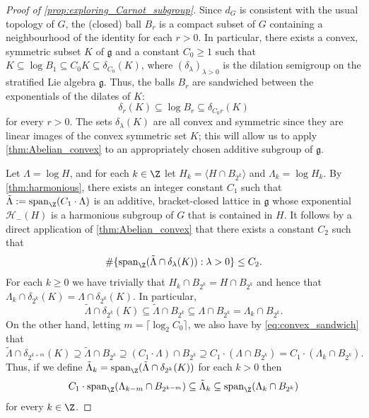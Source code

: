\begin{proof}[Proof of \cref{prop:exploring_Carnot_subgroup}]
Since $d_G$ is consistent with the usual topology of $G$, the (closed) ball $B_r$ is a compact subset of $G$ containing a neighbourhood of the identity for each $r>0$. In particular, there exists a convex, symmetric subset $K$ of $\mathfrak{g}$ and a constant $C_0 \geq 1$ such that $K \subseteq \log B_1 \subseteq C_0 K \subseteq \delta_{C_0}(K)$, where $(\delta_\lambda)_{\lambda>0}$ is the dilation semigroup on the stratified Lie algebra $\mathfrak{g}$. Thus, the balls $B_r$ are sandwiched between the exponentials of the dilates of $K$:
\begin{equation}
\label{eq:convex_sandwich}
\delta_r(K) \subseteq \log B_r \subseteq \delta_{C_0r}(K)
\end{equation}
for every $r>0$.
The sets $\delta_\lambda(K)$ are all convex and symmetric since they are linear images of the convex symmetric set $K$; this will allow us to apply \cref{thm:Abelian_convex} to an appropriately chosen additive subgroup of $\mathfrak{g}$.

\medskip

%
%
%
%
%
%

%

Let $\Lambda = \log H$, and for each $k\in \Z$ let $H_k = \langle H \cap B_{2^k} \rangle$ and $\Lambda_k = \log H_k$. By \cref{thm:harmonious}, there exists an integer constant $C_1$ such that $\tilde \Lambda := \operatorname{span}_\Z(C_1\cdot \Lambda)$ is an additive, bracket-closed lattice in $\mathfrak{g}$ whose exponential $\mathscr{H}_-(H)$ is a harmonious subgroup of $G$ that is contained in $H$.
   It follows by a direct application of \cref{thm:Abelian_convex} that there exists a constant $C_2$ such that
\[
\#\{ \operatorname{span}_\Z (\tilde \Lambda \cap \delta_\lambda(K)) : \lambda >0 \} \leq C_2.
\]
For each $k\geq 0$ we have trivially that $H_k \cap B_{2^k} = H \cap B_{2^k}$ and hence that $\Lambda_k \cap \delta_{2^k}(K)=\Lambda \cap \delta_{2^k}(K)$. In particular, 
\[\tilde \Lambda \cap \delta_{2^k}(K) \subseteq \tilde \Lambda \cap B_{2^k} \subseteq  \Lambda \cap B_{2^k} = \Lambda_k \cap B_{2^k}.\]
%
On the other hand, letting $m=\lceil \log_2 C_0 \rceil$, we also have by \eqref{eq:convex_sandwich} that
\[
\tilde \Lambda \cap \delta_{2^{k+m}}(K) \supseteq \tilde \Lambda \cap B_{2^k} \supseteq (C_1\cdot \Lambda) \cap B_{2^k} \supseteq C_1\cdot (\Lambda \cap B_{2^k}) = C_1\cdot (\Lambda_k \cap B_{2^k}).
\]
Thus, if we define $\tilde \Lambda_k = \operatorname{span}_\Z (\tilde \Lambda \cap \delta_{2^k}(K))$ for each $k>0$ then
\begin{equation}
\label{eq:lambda_tilde_in_the_middle}
C_1\cdot \operatorname{span}_\Z(\Lambda_{k-m} \cap B_{2^{k-m}}) \subseteq \tilde \Lambda_k \subseteq \operatorname{span}_\Z(\Lambda_k \cap B_{2^k})
\end{equation}
for every $k\in \Z$. 


\end{proof}
